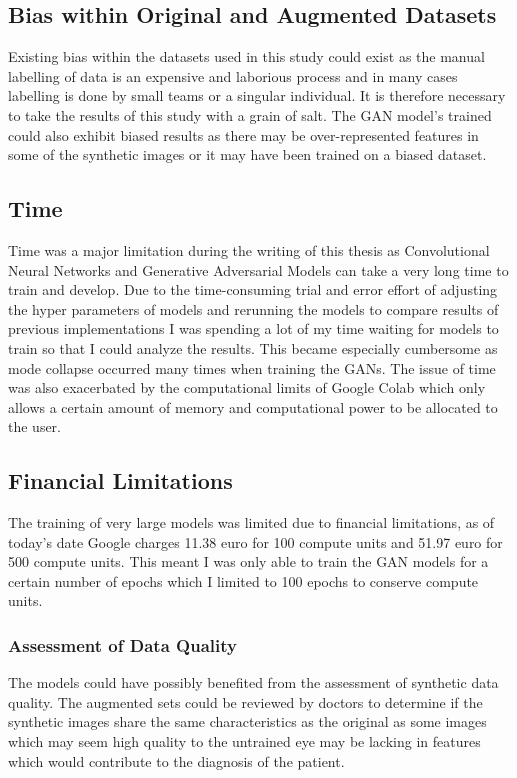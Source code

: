 \subsection{Bias within Original and Augmented Datasets}
Existing bias within the datasets used in this study could exist as the manual labelling of data is an expensive and laborious process and in many cases labelling is done by small teams or a singular individual.  It is therefore necessary to take the results of this study with a grain of salt.  The GAN model's trained could also exhibit biased results as there may be over-represented features in some of the synthetic images or it may have been trained on a biased dataset.    
\subsection{Time}
Time was a major limitation during the writing of this thesis as Convolutional Neural Networks and Generative Adversarial Models can take a very long time to train and develop.  Due to the time-consuming trial and error effort of adjusting the hyper parameters of models and rerunning the models to compare results of previous implementations I was spending a lot of my time waiting for models to train so that I could analyze the results.  This became especially cumbersome as mode collapse occurred many times when training the GANs.  The issue of time was also exacerbated by the computational limits of Google Colab which only allows a certain amount of memory and computational power to be allocated to the user. 
\subsection{Financial Limitations}
The training of very large models was limited due to financial limitations, as of today's date Google charges 11.38 euro for 100 compute units and 51.97 euro for 500 compute units.  This meant I was only able to train the GAN models for a certain number of epochs which I limited to 100 epochs to conserve compute units.
\subsubsection{Assessment of Data Quality}
The models could have possibly benefited from the assessment of synthetic data quality.  The augmented sets could be reviewed by doctors to determine if the synthetic images share the same characteristics as the original as some images which may seem high quality to the untrained eye may be lacking in features which would contribute to the diagnosis of the patient.  
